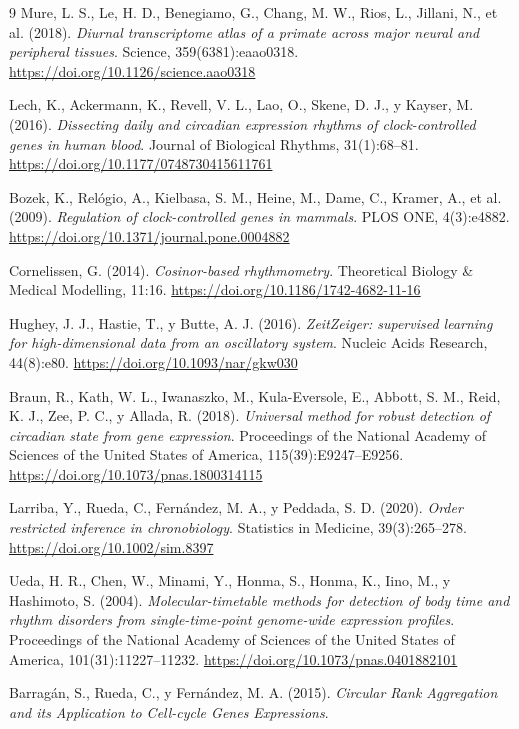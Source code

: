 \documentclass[12pt, a4paper]{report}
\begin{document}
\begin{thebibliography}{9}
Mure, L. S., Le, H. D., Benegiamo, G., Chang, M. W., Rios, L., Jillani, N., et al. (2018).
\textit{Diurnal transcriptome atlas of a primate across major neural and peripheral tissues}.
Science, 359(6381):eaao0318. \url{https://doi.org/10.1126/science.aao0318}

Lech, K., Ackermann, K., Revell, V. L., Lao, O., Skene, D. J., y Kayser, M. (2016).
\textit{Dissecting daily and circadian expression rhythms of clock-controlled genes in human blood}.
Journal of Biological Rhythms, 31(1):68--81. \url{https://doi.org/10.1177/0748730415611761}

Bozek, K., Relógio, A., Kielbasa, S. M., Heine, M., Dame, C., Kramer, A., et al. (2009).
\textit{Regulation of clock-controlled genes in mammals}.
PLOS ONE, 4(3):e4882. \url{https://doi.org/10.1371/journal.pone.0004882}

Cornelissen, G. (2014).
\textit{Cosinor-based rhythmometry}.
Theoretical Biology \& Medical Modelling, 11:16. \url{https://doi.org/10.1186/1742-4682-11-16}

Hughey, J. J., Hastie, T., y Butte, A. J. (2016).
\textit{ZeitZeiger: supervised learning for high-dimensional data from an oscillatory system}.
Nucleic Acids Research, 44(8):e80. \url{https://doi.org/10.1093/nar/gkw030}

Braun, R., Kath, W. L., Iwanaszko, M., Kula-Eversole, E., Abbott, S. M., Reid, K. J., Zee, P. C., y Allada, R. (2018).
\textit{Universal method for robust detection of circadian state from gene expression}.
Proceedings of the National Academy of Sciences of the United States of America, 115(39):E9247--E9256. \url{https://doi.org/10.1073/pnas.1800314115}

Larriba, Y., Rueda, C., Fernández, M. A., y Peddada, S. D. (2020).
\textit{Order restricted inference in chronobiology}.
Statistics in Medicine, 39(3):265--278. \url{https://doi.org/10.1002/sim.8397}

Ueda, H. R., Chen, W., Minami, Y., Honma, S., Honma, K., Iino, M., y Hashimoto, S. (2004).
\textit{Molecular-timetable methods for detection of body time and rhythm disorders from single-time-point genome-wide expression profiles}.
Proceedings of the National Academy of Sciences of the United States of America, 101(31):11227--11232. \url{https://doi.org/10.1073/pnas.0401882101}

Barragán, S., Rueda, C., y Fernández, M. A. (2015).
\textit{Circular Rank Aggregation and its Application to Cell-cycle Genes Expressions}.

\end{thebibliography}
\end{document}
